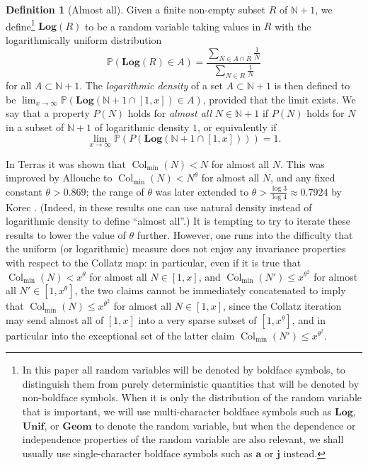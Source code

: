 \documentclass[12pt,a4paper,reqno]{amsart}
\numberwithin{equation}{section}
\theoremstyle{plain}
\theoremstyle{definition}
\newtheorem{definition}[theorem]{Definition}
\renewcommand\P{\mathbb{P}}
\newcommand\N{\mathbb{N}}
\renewcommand\a{\mathbf{a}}
\renewcommand\j{\mathbf{j}}
\newcommand\Unif{\mathbf{Unif}}
\newcommand\Geom{\mathbf{Geom}}
\newcommand\Log{\mathbf{Log}}
\newcommand\Col{{\operatorname{Col}}}
\begin{document}
\begin{definition}[Almost all]  Given a finite non-empty subset $R$ of $\N+1$, we define\footnote{In this paper all random variables will be denoted by boldface symbols, to distinguish them from purely deterministic quantities that will be denoted by non-boldface symbols.  When it is only the distribution of the random variable that is important, we will use multi-character boldface symbols such as $\Log$, $\Unif$, or $\Geom$ to denote the random variable, but when the dependence or independence properties of the random variable are also relevant, we shall usually use single-character boldface symbols such as $\a$ or $\j$ instead.}  $\Log(R)$ to be a random variable taking values in $R$ with the logarithmically uniform distribution
$$ \P( \Log(R) \in A ) = \frac{\sum_{N \in A \cap R} \frac{1}{N}}{\sum_{N \in R} \frac{1}{N}}$$
for all $A \subset \N+1$.  The \emph{logarithmic density} of a set $A \subset \N+1$ is then defined to be $\lim_{x \to \infty} \P( \Log(\N+1 \cap [1,x]) \in A )$, provided that the limit exists.  We say that a property $P(N)$ holds for \emph{almost all} $N \in \N+1$ if $P(N)$ holds for $N$ in a subset of $\N+1$ of logarithmic density $1$, or equivalently if
$$ \lim_{x \to \infty} \P( P( \Log( \N+1 \cap [1,x] ) ) ) = 1.$$
\end{definition}

In Terras \cite{terras} it was shown that $\Col_{\min}(N) < N$ for almost all $N$.  This was improved by Allouche \cite{allouche} to $\Col_{\min}(N) < N^\theta$ for almost all $N$, and any fixed constant $\theta>0.869$; the range of $\theta$ was later extended to $\theta > \frac{\log 3}{\log 4} \approx 0.7924$ by Korec \cite{korec}.  (Indeed, in these results one can use natural density instead of logarithmic density to define ``almost all''.)  It is tempting to try to iterate these results to lower the value of $\theta$ further.  However, one runs into the difficulty that the uniform (or logarithmic) measure does not enjoy any invariance properties with respect to the Collatz map: in particular, even if it is true that $\Col_{\min}(N) < x^\theta$ for almost all $N \in [1,x]$, and $\Col_{\min}(N') \leq x^{\theta^2}$ for almost all $N' \in [1, x^\theta]$, the two claims cannot be immediately concatenated to imply that $\Col_{\min}(N) \leq x^{\theta^2}$ for almost all $N \in [1,x]$, since the Collatz iteration may send almost all of $[1,x]$ into a very sparse subset of $[1,x^\theta]$, and in particular into the exceptional set of the latter claim $\Col_{\min}(N') \leq x^{\theta^2}$.  
\end{document}
